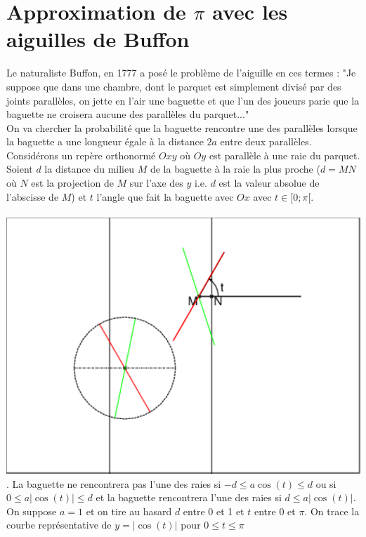 \documentclass[a4paper,11pt]{book}
\begin{document}
\section{Approximation de $\pi$ avec les aiguilles de Buffon}\label{sec:buffon}
Le naturaliste Buffon, en 1777 a pos\'e le probl\`eme de l'aiguille en ces 
termes : "Je suppose que dans une chambre, dont le parquet est simplement 
divis\'e par des joints parall\`eles, on jette en l'air une baguette et que 
l'un des joueurs parie que la baguette ne croisera aucune des parall\`eles du
parquet..."\\
On va chercher la probabilit\'e que la baguette rencontre une des parall\`eles 
lorsque la baguette a une longueur \'egale \`a la distance $2a$ entre deux 
parall\`eles.\\
Consid\'erons un rep\`ere orthonorm\'e $Oxy$ o\`u $Oy$ est parall\`ele \`a une 
raie du parquet.\\
Soient $d$ la distance du milieu $M$ de la baguette \`a la raie la plus proche 
($d=MN$ o\`u $N$ est la projection de $M$ sur l'axe des $y$ i.e. $d$ est la 
valeur absolue de l'abscisse de $M$) et $t$ l'angle que fait la baguette avec 
$Ox$ avec $t\in [0;\pi[$.\\
\ \\
 \includegraphics[width=\textwidth]{buffon}.
La baguette ne rencontrera pas l'une des raies si
$-d\leq a\cos(t) \leq d$ ou  si
$0\leq a|\cos(t)| \leq d$
et la baguette rencontrera l'une des raies si 
$d\leq a|\cos(t)|$.\\
On suppose $a=1$ et on tire au hasard $d$ entre 0 et 1 et $t$ entre 0 et $\pi$.
On trace la courbe repr\'esentative de $y=|\cos(t)|$ pour $0\leq t \leq \pi$ 
\end{document}
